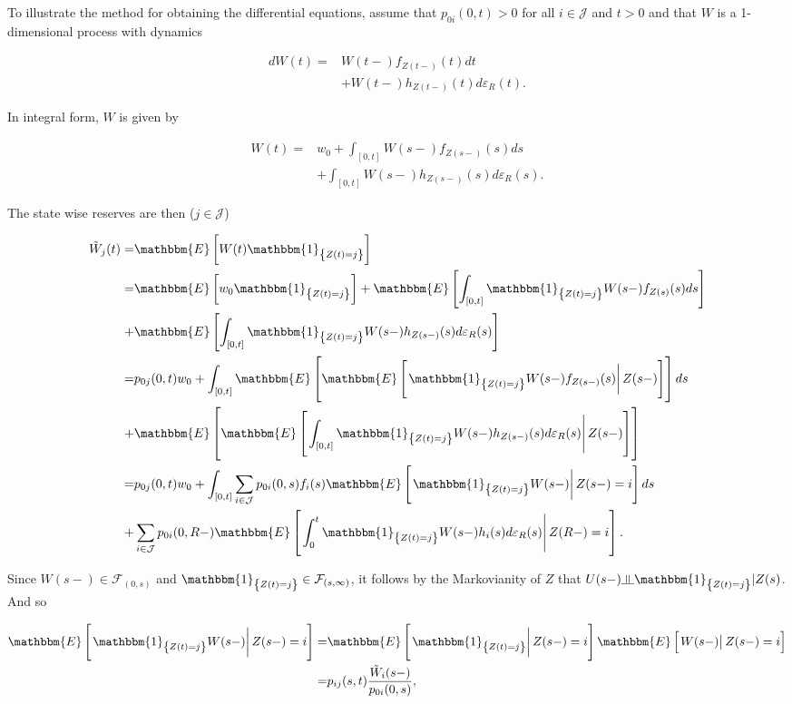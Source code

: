 \documentclass{book}
\newcommand{\indep}{\rotatebox[origin=c]{90}{$\models$}}
\newcommand{\1}[1]{\mathbbm{1}_{\left\lbrace #1 \right\rbrace}}
\newcommand{\expec}[1][def]{\mathbbm{E} \left[ #1 \right]}
\newcommand{\econd}[2][def]{\mathbbm{E} \left[ \left. #1 \right| #2 \right]}
\theoremstyle{break}
\theoremstyle{remark}
\numberwithin{equation}{section}
\begin{document}
To illustrate the method for obtaining the differential equations, assume that $p_{0i}(0,t)>0$ for all $i \in \mathcal{J}$ and $t>0$ and that $W$ is a 1-dimensional process with dynamics


\begin{align*}
	dW(t) =& W(t-) f_{Z(t-)}(t) dt \\
	&+ W(t-) h_{Z(t-)}(t) d \varepsilon_{R}(t).
\end{align*}

In integral form, $W$ is given by

\begin{align*}
	W(t) =& w_0 + \int_{\left[ 0,t \right]} W(s-) f_{Z(s-)}(s) ds \\
	&+ \int_{\left[ 0,t \right]} W(s-) h_{Z(s-)}(s) d \varepsilon_{R}(s).
\end{align*}

The state wise reserves are then ($j \in \mathcal{J}$)

\begin{align} \label{SkalBruges}
	\tilde{W}_j(t) =& \expec[W(t) \1{Z(t)=j}] \nonumber \\
	=& \expec[w_0 \1{Z(t)=j}] + \expec[\int_{\left[ 0,t \right]} \1{Z(t)=j} W(s-) f_{Z(s)}(s) ds] \nonumber \\
	+& \expec[\int_{\left[ 0,t \right]} \1{Z(t)=j} W(s-) h_{Z(s-)}(s) d \varepsilon_{R}(s)] \nonumber \\
	=& p_{0j}(0,t) w_0 + \int_{\left[ 0,t \right]} \mathbbm{E} \left[ \econd[\1{Z(t)=j} W(s-) f_{Z(s-)}(s)]{Z(s-)} \right]ds \nonumber \\
	+& \mathbbm{E} \left[ \econd[ \int_{\left[ 0,t \right]} \1{Z(t)=j} W(s-) h_{Z(s-)}(s) d \varepsilon_{R}(s) ]{Z(s-)} \right] \nonumber \\
	=& p_{0j}(0,t) w_0 + \int_{\left[ 0,t \right]} \sum_{i \in \mathcal{J}} p_{0i}(0,s) f_{i}(s) \econd[\1{Z(t)=j} W(s-)]{Z(s-)=i} ds \\
	+& \sum_{i \in \mathcal{J}} p_{0i}(0,R-) \econd[\int_0^t \1{Z(t)=j} W(s-) h_{i}(s) d \varepsilon_{R}(s)]{Z(R-)=i}. \nonumber
\end{align}

Since $W(s-) \in  \mathcal{F}_{\left( 0,s \right)}$ and $\1{Z(t)=j} \in \mathcal{F}_{\left( s,\infty \right)}$, it follows by the Markovianity of $Z$ that $U(s-) \indep \1{Z(t)=j} | Z(s)$. And so 

\begin{align*}
	\econd[\1{Z(t)=j}W(s-)]{Z(s-)=i} =& \econd[\1{Z(t)=j}]{Z(s-)=i} \econd[W(s-)]{Z(s-)=i} \\
	=& p_{ij}(s,t) \frac{\tilde{W}_i(s-)}{p_{0i}(0,s)},
\end{align*}
\end{document}
